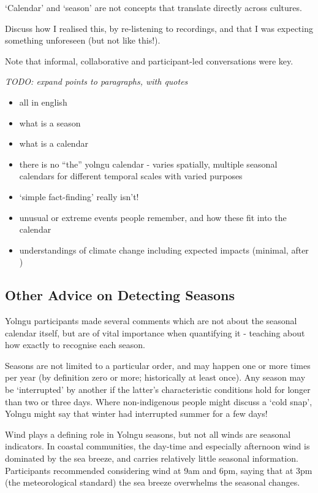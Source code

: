 `Calendar' and `season' are not concepts that translate directly across cultures. 

Discuss how I realised this, by re-listening to recordings, and that I was
expecting something unforeseen (but not like this!).

Note that informal, collaborative and participant-led conversations were key.

\emph{TODO: expand points to paragraphs, with quotes}

\begin{itemize}
\item all in english
\item what is a season
\item what is a calendar
\item there is no ``the'' yolngu calendar - varies spatially,
        multiple seasonal calendars for different temporal scales with varied purposes
\item `simple fact-finding' really isn't!
\item unusual or extreme events people remember, and how these fit into the calendar
\item understandings of climate change including expected impacts (minimal, after \citet{petheram2010})
\end{itemize}


\subsection{Other Advice on Detecting Seasons}
Yolngu participants made several comments which are not about
the seasonal calendar itself, but are of vital importance when quantifying
it - teaching about how exactly to recognise each season.

Seasons are not limited to a particular order, and may happen one or more
times per year (by definition zero or more; historically at least once).
Any season may be `interrupted' by another if the latter's characteristic
conditions hold for longer than two or three days.
Where non-indigenous people might discuss a `cold snap', Yolngu might
say that winter had interrupted summer for a few days!

Wind plays a defining role in Yolngu seasons, but not all winds are
seasonal indicators.  In coastal communities, the day-time and especially
afternoon wind is dominated by the sea breeze, and carries relatively little
seasonal information.  Participants recommended considering wind at 9am
and 6pm, saying that at 3pm (the meteorological standard) the sea breeze
overwhelms the seasonal changes.

